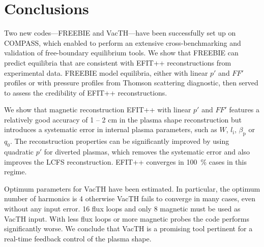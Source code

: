 
\section{Conclusions} %
\label{sec:conclusions}

Two new codes---FREEBIE and VacTH---have been successfully set up on COMPASS, which enabled to perform an extensive cross-benchmarking and validation of free-boundary equilibrium tools. We show that FREEBIE can predict equilibria that are consistent with EFIT++ reconstructions from experimental data. FREEBIE model equilibria, either with linear $p'$ and $FF'$ profiles or with pressure profiles from Thomson scattering diagnostic, then served to assess the credibility of EFIT++ reconstructions. 

We show that magnetic reconstruction EFIT++ with linear $p'$ and $FF'$ features a relatively good accuracy of 1 -- 2 cm in the plasma shape reconstruction but introduces a systematic error in internal plasma parameters, such as $W$, $l_{\mathrm i}$, $\beta_{\mathrm p}$ or $q_0$. The reconstruction properties can be significantly improved by using quadratic $p'$ for diverted plasmas, which removes the systematic error and also improves the LCFS reconstruction. EFIT++ converges in 100~\% cases in this regime.

Optimum parameters for VacTH have been estimated. In particular, the optimum number of harmonics is 4 otherwise VacTH fails to converge in many cases, even without any input error. 16 flux loops and only 8 magnetic must be used as VacTH input. With less flux loops or more magnetic probes the code performs significantly worse. We conclude that VacTH is a promising tool pertinent for a real-time feedback control of the plasma shape.

